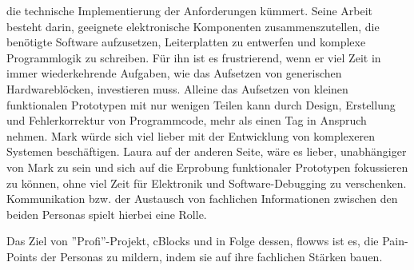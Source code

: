 die technische Implementierung der Anforderungen kümmert. Seine Arbeit besteht darin, geeignete elektronische Komponenten zusammenszutellen, die benötigte Software aufzusetzen, Leiterplatten zu entwerfen und komplexe Programmlogik zu schreiben. Für ihn ist es frustrierend, wenn er viel Zeit in immer wiederkehrende Aufgaben, wie das Aufsetzen von generischen Hardwareblöcken, investieren muss. Alleine das Aufsetzen von kleinen funktionalen Prototypen mit nur wenigen Teilen kann durch Design, Erstellung und Fehlerkorrektur von Programmcode, mehr als einen Tag in Anspruch nehmen. Mark würde sich viel lieber mit der Entwicklung von komplexeren Systemen beschäftigen. Laura auf der anderen Seite, wäre es lieber, unabhängiger von Mark zu sein und sich auf die Erprobung funktionaler Prototypen fokussieren zu können, ohne viel Zeit für Elektronik und Software-Debugging zu verschenken. Kommunikation bzw. der Austausch von fachlichen Informationen zwischen den beiden Personas spielt hierbei eine Rolle.

Das Ziel von ''Profi''-Projekt, cBlocks und in Folge dessen, flowws ist es, die Pain-Points der Personas zu mildern, indem sie auf ihre fachlichen Stärken bauen. 